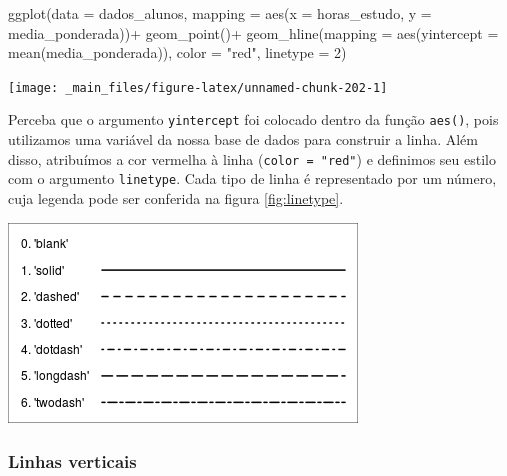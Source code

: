 \documentclass[
  brazilian,
]{book}
\newenvironment{Shaded}{\begin{snugshade}}{\end{snugshade}}
\newcommand{\AttributeTok}[1]{\textcolor[rgb]{0.77,0.63,0.00}{#1}}
\newcommand{\DecValTok}[1]{\textcolor[rgb]{0.00,0.00,0.81}{#1}}
\newcommand{\FunctionTok}[1]{\textcolor[rgb]{0.00,0.00,0.00}{#1}}
\newcommand{\NormalTok}[1]{#1}
\newcommand{\SpecialCharTok}[1]{\textcolor[rgb]{0.00,0.00,0.00}{#1}}
\newcommand{\StringTok}[1]{\textcolor[rgb]{0.31,0.60,0.02}{#1}}
\let\origfigure\figure
\let\endorigfigure\endfigure
\renewenvironment{figure}[1][2] {
    \expandafter\origfigure\expandafter[H]
} {
    \endorigfigure
}
\begin{document}
\begin{Shaded}
\begin{Highlighting}[]
\FunctionTok{ggplot}\NormalTok{(}\AttributeTok{data =}\NormalTok{ dados\_alunos,}
       \AttributeTok{mapping =} \FunctionTok{aes}\NormalTok{(}\AttributeTok{x =}\NormalTok{ horas\_estudo,}
                     \AttributeTok{y =}\NormalTok{ media\_ponderada))}\SpecialCharTok{+}
  \FunctionTok{geom\_point}\NormalTok{()}\SpecialCharTok{+}
  \FunctionTok{geom\_hline}\NormalTok{(}\AttributeTok{mapping =} \FunctionTok{aes}\NormalTok{(}\AttributeTok{yintercept =} \FunctionTok{mean}\NormalTok{(media\_ponderada)),}
             \AttributeTok{color =} \StringTok{"red"}\NormalTok{,}
             \AttributeTok{linetype =} \DecValTok{2}\NormalTok{)}
\end{Highlighting}
\end{Shaded}

\begin{center}\texttt{[image: \_main\_files/figure-latex/unnamed-chunk-202-1]} \end{center}

Perceba que o argumento \texttt{yintercept} foi colocado dentro da função \texttt{aes()}, pois utilizamos uma variável da nossa base de dados para construir a linha. Além disso, atribuímos a cor vermelha à linha (\texttt{color\ =\ "red"}) e definimos seu estilo com o argumento \texttt{linetype}. Cada tipo de linha é representado por um número, cuja legenda pode ser conferida na figura \ref{fig:linetype}.

\begin{figure}

{\centering \includegraphics[width=0.7\linewidth]{imagens/linetype} 

}

\caption{Possíveis tipos de linhas a partir do argumento `linetype`. Fonte: R Graphics Cookbook.}\label{fig:linetype}
\end{figure}

\hypertarget{linhas-verticais}{%
\subsubsection*{Linhas verticais}\label{linhas-verticais}}
\end{document}
